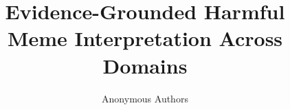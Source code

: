 \documentclass[sigconf,anonymous,review]{acmart}
\begin{document}
\title{Evidence-Grounded Harmful Meme Interpretation Across Domains}
\author{Anonymous Authors}

\begin{abstract}

\end{abstract}

\maketitle













\end{document}
